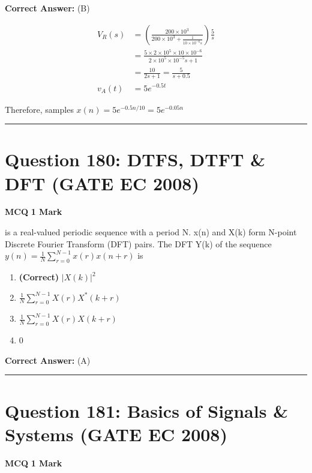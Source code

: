 \documentclass[11pt,a4paper]{article}
\begin{document}
\noindent \textbf{Correct Answer:} (B)

\begin{tcolorbox}[solbox, title=Detailed Solution -- Question 179]
\[
\begin{aligned} V_{R}(s) &=\left(\frac{200 \times 10^{3}}{200 \times 10^{3}+\frac{1}{10 \times 10^{-6} s}}\right) \frac{5}{s} \\ &=\frac{5 \times 2 \times 10^{5} \times 10 \times 10^{-6}}{2 \times 10^{5} \times 10^{-5} s+1} \\ &=\frac{10}{2 s+1}=\frac{5}{s+0.5} \\ v_{A}(t) &=5 e^{-0.5 t} \end{aligned}
\]

 Therefore, samples
$x(n)=5 e^{-0.5 n / 10}=5 e^{-0.05 n}$
\end{tcolorbox}

\vspace{1.5em}
\hrule
\vspace{1.5em}

\section*{Question 180: DTFS, DTFT \& DFT (GATE EC 2008)}
\noindent \textbf{\color{primary}MCQ} \hfill \textbf{\color{secondary}1 Mark}


 is a real-valued periodic sequence with a period N. x(n) and X(k) form N-point Discrete Fourier Transform (DFT) pairs. The DFT Y(k) of the sequence 
$y(n)=\frac{1}{N}\sum_{r=0}^{N-1}x(r)x(n+r)$ is


\begin{enumerate}[label=(\Alph*)]
    \item \textbf{(Correct)} $|X(k)|^{2}$
    \item $\frac{1}{N}\sum_{r=0}^{N-1}X(r)X^*(k+r)$
    \item $\frac{1}{N}\sum_{r=0}^{N-1}X(r)X(k+r)$
    \item 0
\end{enumerate}

\noindent \textbf{Correct Answer:} (A)


\vspace{1.5em}
\hrule
\vspace{1.5em}

\section*{Question 181: Basics of Signals \& Systems (GATE EC 2008)}
\noindent \textbf{\color{primary}MCQ} \hfill \textbf{\color{secondary}1 Mark}
\end{document}
